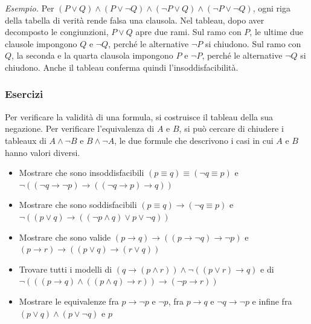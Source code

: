 \medskip
\noindent
\textit{Esempio.} Per
$(P\vee Q)\wedge(P\vee\neg Q)\wedge(\neg P\vee Q)\wedge(\neg P\vee\neg Q)$,
ogni riga della tabella di verità rende falsa una clausola.
Nel tableau, dopo aver decomposto le congiunzioni, $P\vee Q$
apre due rami. Sul ramo con $P$, le ultime due clausole impongono
$Q$ e $\neg Q$, perché le alternative $\neg P$ si chiudono.
Sul ramo con $Q$, la seconda e la quarta clausola impongono
$P$ e $\neg P$, perché le alternative $\neg Q$ si chiudono.
Anche il tableau conferma quindi l'insoddisfacibilità.

\subsubsection*{Esercizi}
Per verificare la validità di una formula, si costruisce il tableau
della sua negazione. Per verificare l'equivalenza di $A$ e $B$,
si può cercare di chiudere i tableaux di $A\wedge\neg B$ e
$B\wedge\neg A$, le due formule che descrivono i casi in cui
$A$ e $B$ hanno valori diversi.

\begin{itemize}
    \item Mostrare che sono insoddisfacibili
          $(p\equiv q)\equiv(\neg q\equiv p)$ e
          $\neg((\neg q\to\neg p)\to((\neg q\to p)\to q))$
    \item Mostrare che sono soddisfacibili
          $(p\equiv q)\to(\neg q\equiv p)$ e
          $\neg((p\vee q)\to((\neg p\wedge q)\vee p\vee\neg q))$
    \item Mostrare che sono valide
          $(p\to q)\to((p\to\neg q)\to\neg p)$ e
          $(p\to r)\to((p\vee q)\to(r\vee q))$
    \item Trovare tutti i modelli di
          $(q\to(p\wedge r))\wedge\neg((p\vee r)\to q)$ e di
          $\neg(((p\to q)\wedge((p\wedge q)\to r))\to(\neg p\to r))$
    \item Mostrare le equivalenze fra $p\to\neg p$ e $\neg p$,
          fra $p\to q$ e $\neg q\to\neg p$ e infine fra
          $(p\vee q)\wedge(p\vee\neg q)$ e $p$
\end{itemize}
